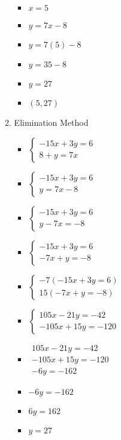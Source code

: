 \documentclass{article}
\begin{document}
\begin{enumerate}
\begin{enumerate}
\begin{itemize}
    \item $x=5$
    \item $y=7x-8$
    \item $y=7(5)-8$
    \item $y=35-8$
    \item $y=27$
    \item $(5,27)$
    \end{itemize}
  \item Elimination Method
    \begin{itemize}
    \item $\left\{ \begin{array}{l}
          -15x+3y=6 \\
          8+y=7x \end{array} \right.$
    \item $\left\{ \begin{array}{l}
          -15x+3y=6 \\
          y=7x-8 \end{array} \right.$
    \item $\left\{ \begin{array}{l}
          -15x+3y=6 \\
          y-7x=-8 \end{array} \right.$
    \item $\left\{ \begin{array}{l}
          -15x+3y=6 \\
          -7x+y=-8 \end{array} \right.$
    \item $\left\{ \begin{array}{l}
          -7(-15x+3y=6) \\
          15(-7x+y=-8) \end{array} \right.$
    \item $\left\{ \begin{array}{l}
          105x-21y=-42 \\
          -105x+15y=-120 \end{array} \right.$
    \item $\begin{array}{l}
          105x-21y=-42 \\
          -105x+15y=-120 \\ \hline 
          -6y=-162\end{array}$
    \item $-6y=-162$
    \item $6y=162$
    \item $y=27$

\end{itemize}
\end{enumerate}
\end{enumerate}
\end{document}
